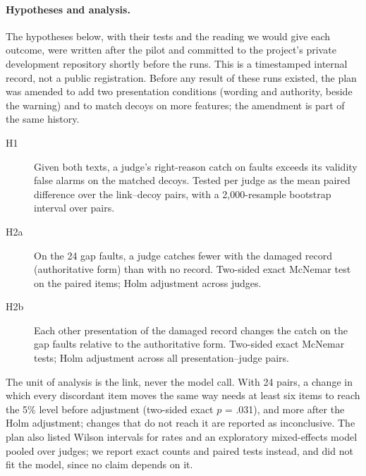 \paragraph{Hypotheses and analysis.}
The hypotheses below, with their tests and the reading we would give each outcome, were written after the pilot and
committed to the project's private development repository shortly before the runs. This is a timestamped internal record, not a public
registration. Before any result of these runs existed, the plan was amended to add two presentation conditions (wording and
authority, beside the warning) and to match decoys on more features; the amendment is part of the same history.
\begin{description}
  \item[H1] Given both texts, a judge's right-reason catch on faults exceeds its validity false alarms on the matched
  decoys. Tested per judge as the mean paired difference over the \ENLinks{} link--decoy pairs, with a 2,000-resample
  bootstrap interval over pairs.
  \item[H2a] On the 24 gap faults, a judge catches fewer with the damaged record (authoritative form) than with no
  record. Two-sided exact McNemar test on the paired items; Holm adjustment across judges.
  \item[H2b] Each other presentation of the damaged record changes the catch on the gap faults relative to the
  authoritative form. Two-sided exact McNemar tests; Holm adjustment across all \EHTwobTests{} presentation--judge
  pairs.
\end{description}
The unit of analysis is the link, never the model call. With 24 pairs, a change in which every discordant item
moves the same way needs at least six items to reach the 5\% level before adjustment (two-sided exact $p$ = .031), and
more after the Holm adjustment; changes that do not reach it are reported as inconclusive. The plan also listed Wilson
intervals for rates and an exploratory mixed-effects model pooled over judges; we report exact counts and paired tests
instead, and did not fit the model, since no claim depends on it.

